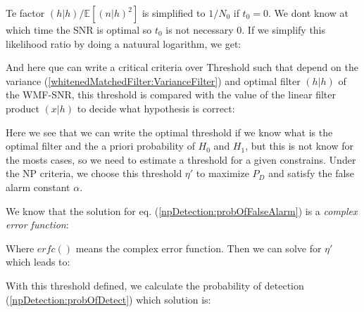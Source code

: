 \newp Te factor $(h|h) / \mathbb{E}[(n|h)^{2}]$ is simplified to $1/N_0$ if $t_0 = 0$. We dont know at which time the SNR is optimal so $t_0$ is not necessary 0. If we simplify this likelihood ratio by doing a natuural logarithm, we get:



\newp And here que can write a critical criteria over Threshold  such that depend on the variance (\ref{whitenedMatchedFilter:VarianceFilter}) and optimal filter $(h|h)$ of the WMF-SNR, this threshold is compared with the value of the linear filter product $(x|h)$ to decide what hypothesis is correct: 



\newp Here we see that we can write the optimal threshold if we know what is the optimal filter and the a priori probability of $H_0$ and $H_1$, but this is not know for the mosts cases, so we need to estimate a threshold for a given constrains. Under the NP criteria, we choose this threshold $\eta'$ to maximize $P_D$ and satisfy the false alarm constant $\alpha$.

\newp We know that the solution for eq. (\ref{npDetection:probOfFalseAlarm}) is a \textit{complex error function}:

\newp Where $erfc()$ means the complex error function. Then we can solve for $\eta'$ which leads to:


\newp With this threshold defined, we calculate the probability of detection (\ref{npDetection:probOfDetect}) which solution is:

